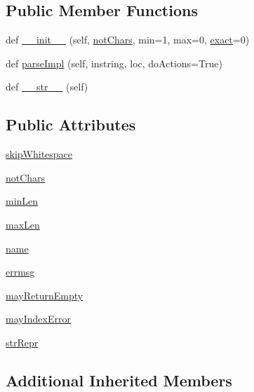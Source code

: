 \subsection*{Public Member Functions}
\begin{DoxyCompactItemize}
\item 
def \hyperlink{classpyparsing_1_1CharsNotIn_a76ba70dcc5a900de66aaffbec6e591b6}{\+\_\+\+\_\+init\+\_\+\+\_\+} (self, \hyperlink{classpyparsing_1_1CharsNotIn_a6ab156cde8afccc0376287789a0fee6f}{not\+Chars}, min=1, max=0, \hyperlink{namespacepyparsing_a832e22d9e8c149774782b6f58d10278f}{exact}=0)
\item 
def \hyperlink{classpyparsing_1_1CharsNotIn_a367890a9b42df51b44af5743ecd33e1c}{parse\+Impl} (self, instring, loc, do\+Actions=True)
\item 
def \hyperlink{classpyparsing_1_1CharsNotIn_a90decd5cd38668efa42d94a27daa3647}{\+\_\+\+\_\+str\+\_\+\+\_\+} (self)
\end{DoxyCompactItemize}
\subsection*{Public Attributes}
\begin{DoxyCompactItemize}
\item 
\hyperlink{classpyparsing_1_1CharsNotIn_a45671a5684c4665568e404fb4c2d2a6e}{skip\+Whitespace}
\item 
\hyperlink{classpyparsing_1_1CharsNotIn_a6ab156cde8afccc0376287789a0fee6f}{not\+Chars}
\item 
\hyperlink{classpyparsing_1_1CharsNotIn_af629107be829712fcaa94d78a1a99305}{min\+Len}
\item 
\hyperlink{classpyparsing_1_1CharsNotIn_a86956fe54bec99f803b2ae1fa631dafe}{max\+Len}
\item 
\hyperlink{classpyparsing_1_1CharsNotIn_a3220cdc166480fdee4d94f03e9b9800e}{name}
\item 
\hyperlink{classpyparsing_1_1CharsNotIn_aea40ddaca38bd0d78f8ccb5969af9d97}{errmsg}
\item 
\hyperlink{classpyparsing_1_1CharsNotIn_a001885a21b1f5ea945e7b57b9bde88a5}{may\+Return\+Empty}
\item 
\hyperlink{classpyparsing_1_1CharsNotIn_acc0b542100488a8830052673f0102a6e}{may\+Index\+Error}
\item 
\hyperlink{classpyparsing_1_1CharsNotIn_ab1b4938ee89620d4c36a5f48a9f17954}{str\+Repr}
\end{DoxyCompactItemize}
\subsection*{Additional Inherited Members}


